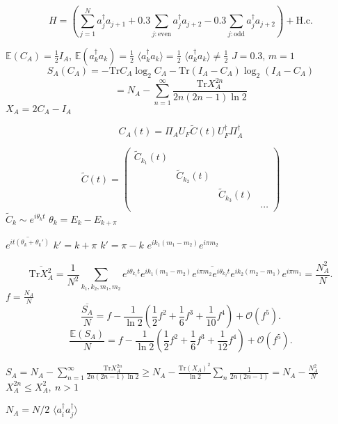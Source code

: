 \documentclass{beamer}
\begin{document}
\begin{frame}
      \[H=(\sum_{j=1}^{N}a_{j}^{\dagger}a_{j+1}+0.3\sum_{j:\mathrm{even}}a_{j}^{\dagger}a_{j+2}-0.3\sum_{j:\mathrm{odd}}a_{j}^{\dagger}a_{j+2})+\mathrm{H.c}.\]
\end{frame} 
\begin{frame}
   $\mathbb{E}(C_{A})=\frac{1}{2}I_{A}$, $\mathbb{E}(a_k^{\dagger}a_k)=\frac{1}{2}$
   $\langle a_k^{\dagger}a_k\rangle=\frac{1}{2}$
   $\langle a_k^{\dagger}a_k\rangle\neq\frac{1}{2}$
   $J=0.3$, $m=1$
   \[
      S_A(C_A)=-\mathrm{Tr}C_A\log_2{C_A}-\mathrm{Tr}(I_A-C_A)\log_2{(I_A-C_A)}
      \]
      \[
         =N_A-\sum_{n=1}^\infty \frac{\mathrm{Tr}X_A^{2n}}{2n(2n-1)\ln{2}}
         \]
         $X_A=2C_A-I_A$
\end{frame}
\begin{frame}
   \[   C_A(t)=\Pi_AU_F\tilde{C}(t)U_F^{\dagger}\Pi_A^{\dagger}\]
   
   \begin{equation*}
   \tilde{C}(t)=\begin{pmatrix}\tilde{C}_{k_{1}}(t)\\
 & \tilde{C}_{k_{2}}(t)\\
 &  & \tilde{C}_{k_{3}}(t)\\
 &  &  & \cdots
\end{pmatrix}
   \end{equation*}
$\tilde{C}_{k}\sim e^{i\theta_k t}$
$\theta_k=E_k-E_{k+\pi}$
\end{frame}
\begin{frame}
   $\overline{e^{it(\theta_k+\theta_k')}}$
   $k'=k+\pi$ $k'=\pi-k$
   $e^{ik_1(m_1-m_2)}e^{i\pi m_2}$
\end{frame}
\begin{frame}
   \[\overline{\mathrm{Tr} X_{A}^{2}}= \frac{1}{N^{2}}\sum_{k_{1},k_{2},m_{1},m_{2}}\overline{e^{i\theta_{k_{1}}t}e^{ik_{1}(m_{1}-m_{2})}e^{i\pi m_{2}}e^{i\theta_{k_{2}}t}e^{ik_{2}(m_{2}-m_{1})}e^{i\pi m_{1}}}
= \frac{N_{A}^{2}}{N}.\]
$f=\frac{N_A}{N}$
\begin{equation}
\frac{\overline{S_{A}}}{N}=f-\frac{1}{\ln{2}}\left(\frac{1}{2}f^{2}+\frac{1}{6}f^{3}+\frac{1}{10}f^{4}\right)+\mathcal{O}(f^{5}).\label{eq:the_Page_curve_for_NNH}
\end{equation}
\begin{equation}
\frac{\mathbb{E}(S_{A})}{N}=f-\frac{1}{\ln{2}}\left(\frac{1}{2}f^{2}+\frac{1}{6}f^{3}+\frac{1}{12}f^{4}\right)+\mathcal{O}(f^{5}).\label{eq:the_Page_curve_result_for_CCRFG}
\end{equation}
\end{frame}
\begin{frame}
   $S_{A}=N_A-\sum_{n=1}^\infty \frac{\mathrm{Tr}X_A^{2n}}{2n(2n-1)\ln{2}}\geq N_{A}-\frac{\mathrm{Tr}(X_{A})^{2}}{\ln2}\sum_{n}\frac{1}{2n(2n-1)}=N_{A}-\frac{N_{A}^{2}}{N}$
   $X_{A}^{2n} \leq X_A^2,\ n>1$
\end{frame}
\begin{frame}
$N_A=N/2$
$\langle a_i^{\dagger}a_j^{\dagger}\rangle$
\end{frame}
\end{document}
